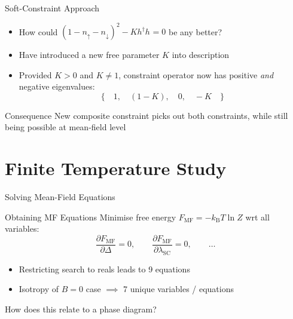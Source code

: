 \documentclass[13pt]{beamer}
\begin{document}
  \begin{frame}{Soft-Constraint Approach}

  \begin{itemize}
    \item How could $ (1 - n_{\uparrow} - n_{\downarrow})^2 - K h^{\dagger} h^{} = 0 $ be any better?
    \item Have introduced a new free parameter $ K $ into description
    \item Provided $ K > 0 $ and $ K \neq 1 $, constraint operator now has positive \textit{and} negative eigenvalues: $$ \{ \quad 1, \quad (1 - K), \quad 0, \quad -K \quad \} $$
  \end{itemize}

  \begin{block}{Consequence}
  New composite constraint picks out both constraints, while still being possible at mean-field level
  \end{block}
  \end{frame}

  \section{Finite Temperature Study}

  \begin{frame}{Solving Mean-Field Equations}

    \begin{block}{Obtaining MF Equations}
    Minimise free energy $ F_{\text{MF}} = - k_{\text{B}} T \ln{Z} $ wrt all variables: $$ \frac{\partial F_{\text{MF}}}{\partial \Delta} = 0, \qquad \frac{\partial F_{\text{MF}}}{\partial \lambda_{\text{SC}}} = 0, \qquad \ldots $$
    \end{block}

    \begin{itemize}
      \item Restricting search to reals leads to 9 equations
      \item Isotropy of $ B = 0 $ case $ \implies $ 7 unique variables / equations
    \end{itemize}

    \vfill

    \centering \alert{\Large How does this relate to a phase diagram?}
  \end{frame}
\end{document}
